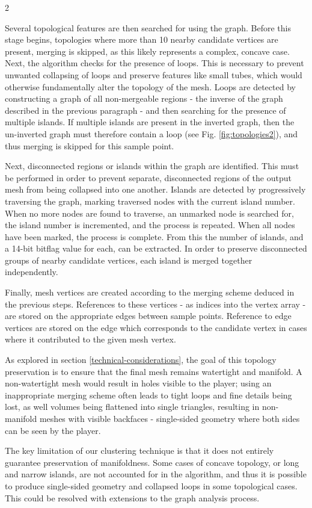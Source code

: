 \documentclass[]{article}
\begin{document}
\FloatBarrier
\begin{multicols}{2}

Several topological features are then searched for using the graph. Before this stage begins, topologies where more than 10 nearby candidate vertices are present, merging is skipped, as this likely represents a complex, concave case. Next, the algorithm checks for the presence of loops. This is necessary to prevent unwanted collapsing of loops and preserve features like small tubes, which would otherwise fundamentally alter the topology of the mesh. Loops are detected by constructing a graph of all non-mergeable regions - the inverse of the graph described in the previous paragraph - and then searching for the presence of multiple islands. If multiple islands are present in the inverted graph, then the un-inverted graph must therefore contain a loop (see Fig. \ref{fig:topologies2}), and thus merging is skipped for this sample point.

Next, disconnected regions or islands within the graph are identified. This must be performed in order to prevent separate, disconnected regions of the output mesh from being collapsed into one another. Islands are detected by progressively traversing the graph, marking traversed nodes with the current island number. When no more nodes are found to traverse, an unmarked node is searched for, the island number is incremented, and the process is repeated. When all nodes have been marked, the process is complete. From this the number of islands, and a 14-bit bitflag value for each, can be extracted. In order to preserve disconnected groups of nearby candidate vertices, each island is merged together independently.

Finally, mesh vertices are created according to the merging scheme deduced in the previous steps. References to these vertices - as indices into the vertex array - are stored on the appropriate edges between sample points. Reference to edge vertices are stored on the edge which corresponds to the candidate vertex in cases where it contributed to the given mesh vertex.

As explored in section \ref{technical-considerations}, the goal of this topology preservation is to ensure that the final mesh remains watertight and manifold. A non-watertight mesh would result in holes visible to the player; using an inappropriate merging scheme often leads to tight loops and fine details being lost, as well volumes being flattened into single triangles, resulting in non-manifold meshes with visible backfaces - single-sided geometry where both sides can be seen by the player.

The key limitation of our clustering technique is that it does not entirely guarantee preservation of manifoldness. Some cases of concave topology, or long and narrow islands, are not accounted for in the algorithm, and thus it is possible to produce single-sided geometry and collapsed loops in some topological cases. This could be resolved with extensions to the graph analysis process.

\end{multicols}
\end{document}
